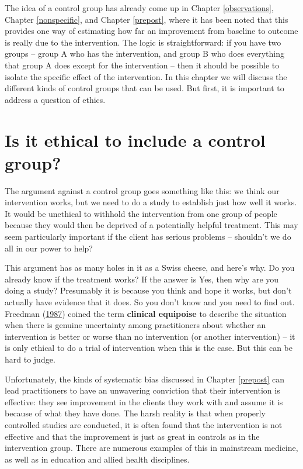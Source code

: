 \documentclass{krantz}
\begin{document}
The idea of a control group has already come up in Chapter \ref{observations}, Chapter \ref{nonspecific}, and Chapter \ref{prepost}, where it has been noted that this provides one way of estimating how far an improvement from baseline to outcome is really due to the intervention. The logic is straightforward: if you have two groups -- group A who has the intervention, and group B who does everything that group A does except for the intervention -- then it should be possible to isolate the specific effect of the intervention. In this chapter we will discuss the different kinds of control groups that can be used. But first, it is important to address a question of ethics.

\hypertarget{is-it-ethical-to-include-a-control-group}{%
\section{Is it ethical to include a control group?}\label{is-it-ethical-to-include-a-control-group}}

The argument against a control group goes something like this: we think our intervention works, but we need to do a study to establish just how well it works. It would be unethical to withhold the intervention from one group of people because they would then be deprived of a potentially helpful treatment. This may seem particularly important if the client has serious problems -- shouldn't we do all in our power to help?

This argument has as many holes in it as a Swiss cheese, and here's why. Do you already know if the treatment works? If the answer is Yes, then why are you doing a study? Presumably it is because you think and hope it works, but don't actually have evidence that it does. So you don't know and you need to find out. Freedman (\protect\hyperlink{ref-freedman1987}{1987}) coined the term \textbf{clinical equipoise}  to describe the situation when there is genuine uncertainty among practitioners about whether an intervention is better or worse than no intervention (or another intervention) -- it is only ethical to do a trial of intervention when this is the case. But this can be hard to judge.

Unfortunately, the kinds of systematic bias discussed in Chapter \ref{prepost} can lead practitioners to have an unwavering conviction that their intervention is effective: they see improvement in the clients they work with and assume it is because of what they have done. The harsh reality is that when properly controlled studies are conducted, it is often found that the intervention is not effective and that the improvement is just as great in controls as in the intervention group. There are numerous examples of this in mainstream medicine, as well as in education and allied health disciplines.
\end{document}
